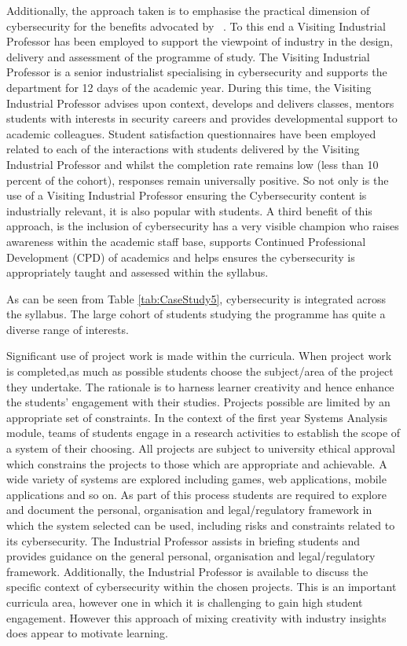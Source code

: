 \documentclass[conference]{IEEEtran}
\begin{document}
Additionally, the approach taken is to emphasise the practical dimension of cybersecurity for the benefits advocated by ~\cite{Weiss:2013:THC:2527148.2527180}. To this end a Visiting Industrial Professor has been employed to support the viewpoint of industry in the design, delivery and assessment of the programme of study. The Visiting Industrial Professor is a senior industrialist specialising in cybersecurity and supports the department for 12 days of the academic year. During this time, the Visiting Industrial Professor advises upon context, develops and delivers classes, mentors students with interests in security careers and provides developmental support to academic colleagues. Student satisfaction questionnaires have been employed related to each of the interactions with students delivered by the Visiting Industrial Professor and whilst the completion rate remains low (less than 10 percent of the cohort), responses remain universally positive. So not only is the use of a Visiting Industrial Professor ensuring the Cybersecurity content is industrially relevant, it is also popular with students. A third benefit of this approach, is the inclusion of cybersecurity has a very visible champion who raises awareness within the academic staff base, supports Continued Professional Development (CPD) of academics and helps ensures the cybersecurity is appropriately taught and assessed within the syllabus.

As can be seen from Table {\ref{tab:CaseStudy5}}, cybersecurity is integrated across the syllabus. The  large cohort of students studying the programme has quite a diverse range of interests. 

 

Significant use of project work is made within the curricula. When project work is completed,as much as possible students choose the subject/area of the project they undertake. The rationale is to harness learner creativity {\cite{Bradley2020}} and hence enhance the students' engagement with their studies. Projects possible are limited by an appropriate set of constraints. In the context of the first year Systems Analysis module, teams of students engage in a research activities  to establish the scope of a system of their choosing. All projects are subject to university ethical approval which constrains the projects to those which are appropriate and achievable. A wide variety of systems are explored including games, web applications, mobile applications and so on. As part of this process students are required to explore and document the personal, organisation and legal/regulatory framework in which the system selected can be used, including risks and constraints related to its cybersecurity. The Industrial Professor assists in briefing students and provides guidance on the general personal, organisation and legal/regulatory framework. Additionally, the Industrial Professor is available to discuss the specific context of cybersecurity within the chosen projects. This is an important curricula area, however one in which it is challenging to gain high student engagement. However this approach of mixing creativity with industry insights does appear to motivate learning. 
\end{document}
